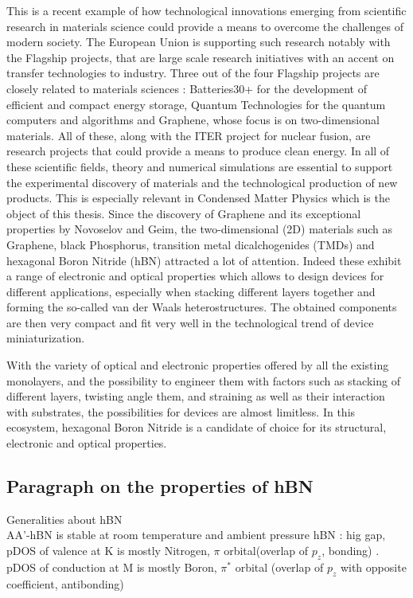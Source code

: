 This is a recent example of how technological innovations emerging from scientific research in materials science could provide a means to overcome the challenges of modern society. The European Union is supporting such research notably with the Flagship projects, that are large scale research initiatives with an accent on transfer technologies to industry. Three out of the four Flagship projects are closely related to materials sciences : Batteries30+ for the development of efficient and compact energy storage, Quantum Technologies for the quantum computers and algorithms and Graphene, whose focus is on two-dimensional materials. All of these, along with the ITER project for nuclear fusion, are research projects that could provide a means to produce clean energy. In all of these scientific fields, theory and numerical simulations are essential to support the experimental discovery of materials and the technological production of new products. This is especially relevant in Condensed Matter Physics which is the object of this thesis. Since the discovery of Graphene and its exceptional properties by Novoselov and Geim,\cite{graphene} the two-dimensional (2D) materials such as Graphene, black Phosphorus, transition metal dicalchogenides (TMDs) and hexagonal Boron Nitride (hBN) attracted a lot of attention. Indeed these exhibit a range of electronic and optical properties which allows to design devices for different applications, especially when stacking different layers together and forming the so-called van der Waals heterostructures.\cite{something} The obtained components are then very compact and fit very well in the technological trend of device miniaturization.

With the variety of optical and electronic properties offered by all the existing monolayers, and the possibility to engineer them with factors such as stacking of different layers,\cite{sponza2018direct} twisting angle them,\cite{latil2023structural, impellizzeri2022electronic} and straining\cite{blundo2021strain} as well as their interaction with substrates, the possibilities for devices are almost limitless. In this ecosystem, hexagonal Boron Nitride is a candidate of choice for its structural, electronic and optical properties.

% 
\subsection{Paragraph on the properties of hBN}
Generalities about hBN \\
AA'-hBN is stable at room temperature and ambient pressure
hBN : hig gap, pDOS of valence at K is mostly Nitrogen, $\pi$ orbital(overlap of $p_z$, bonding)  . pDOS of conduction at M is mostly Boron, $\pi^*$ orbital (overlap of $p_z$ with opposite coefficient, antibonding)\\



